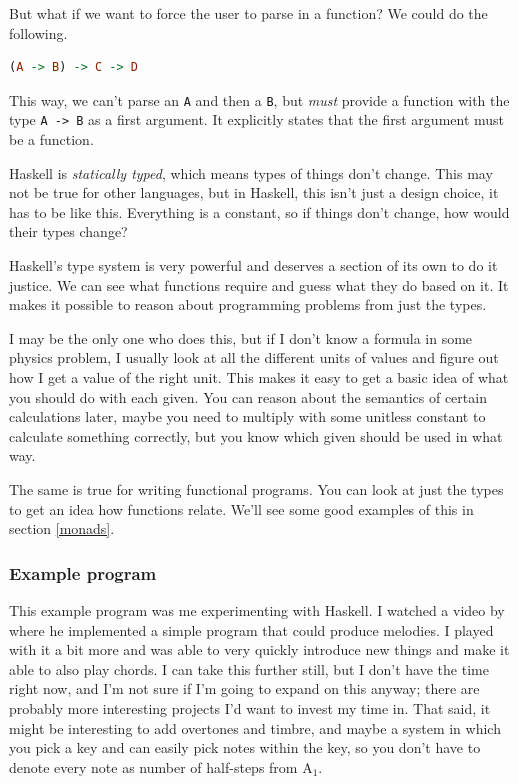 \documentclass[11pt]{article}
\begin{document}
But what if we want to force the user to parse in a function? We could do the following.
\begin{lstlisting}[language=Haskell]
(A -> B) -> C -> D
\end{lstlisting}
This way, we can't parse an \texttt{A} and then a \texttt{B}, but \emph{must}
provide a function with the type \texttt{A -> B} as a first argument. It
explicitly states that the first argument must be a function.

Haskell is \emph{statically typed}, which means types of things don't change.
This may not be true for other languages, but in Haskell, this isn't just a
design choice, it has to be like this. Everything is a constant, so if things
don't change, how would their types change?

Haskell's type system is very powerful and deserves a section of its own to do
it justice. We can see what functions require and guess what they do based on
it. It makes it possible to reason about programming problems from just the
types.

I may be the only one who does this, but if I don't know a formula in some
physics problem, I usually look at all the different units of values and figure
out how I get a value of the right unit. This makes it easy to get a basic idea
of what you should do with each given. You can reason about the semantics of
certain calculations later, maybe you need to multiply with some unitless
constant to calculate something correctly, but you know which given should be
used in what way.

The same is true for writing functional programs. You can look at just the
types to get an idea how functions relate. We'll see some good examples of this
in section \ref{monads}.

\subsubsection{Example program}

This example program was me experimenting with Haskell. I watched a video by
\textcite{tsmusic} where he implemented a simple program that could produce
melodies. I played with it a bit more and was able to very quickly introduce
new things and make it able to also play chords. I can take this further still,
but I don't have the time right now, and I'm not sure if I'm going to expand on
this anyway; there are probably more interesting projects I'd want to invest my
time in. That said, it might be interesting to add overtones and timbre, and
maybe a system in which you pick a key and can easily pick notes within the
key, so you don't have to denote every note as number of half-steps from
A\(_1\).
\end{document}
